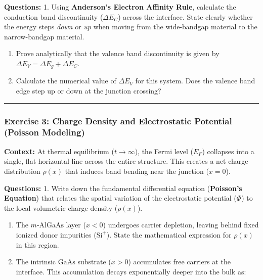 \documentclass[
]{article}
\begin{document}
\textbf{Questions:} 1. Using \textbf{Anderson's Electron Affinity Rule},
calculate the conduction band discontinuity (\(\Delta E_C\)) across the
interface. State clearly whether the energy steps \emph{down} or
\emph{up} when moving from the wide-bandgap material to the
narrow-bandgap material.

\begin{enumerate}
\def\labelenumi{\arabic{enumi}.}
\setcounter{enumi}{1}
\item
  Prove analytically that the valence band discontinuity is given by
  \(\Delta E_V = \Delta E_g + \Delta E_C\).
\item
  Calculate the numerical value of \(\Delta E_V\) for this system. Does
  the valence band edge step up or down at the junction crossing?
\end{enumerate}

\begin{center}\rule{0.5\linewidth}{0.5pt}\end{center}

\subsubsection{Exercise 3: Charge Density and Electrostatic Potential
(Poisson
Modeling)}\label{exercise-3-charge-density-and-electrostatic-potential-poisson-modeling}

\textbf{Context:} At thermal equilibrium (\(t \to \infty\)), the Fermi
level (\(E_F\)) collapses into a single, flat horizontal line across the
entire structure. This creates a net charge distribution \(\rho(x)\)
that induces band bending near the junction (\(x = 0\)).

\textbf{Questions:} 1. Write down the fundamental differential equation
(\textbf{Poisson's Equation}) that relates the spatial variation of the
electrostatic potential (\(\Phi\)) to the local volumetric charge
density (\(\rho(x)\)).

\begin{enumerate}
\def\labelenumi{\arabic{enumi}.}
\setcounter{enumi}{1}
\item
  The \(m\text{-AlGaAs}\) layer (\(x < 0\)) undergoes carrier depletion,
  leaving behind fixed ionized donor impurities (\(\text{Si}^+\)). State
  the mathematical expression for \(\rho(x)\) in this region.
\item
  The intrinsic \(\text{GaAs}\) substrate (\(x > 0\)) accumulates free
  carriers at the interface. This accumulation decays exponentially
  deeper into the bulk as:
\end{enumerate}
\end{document}
